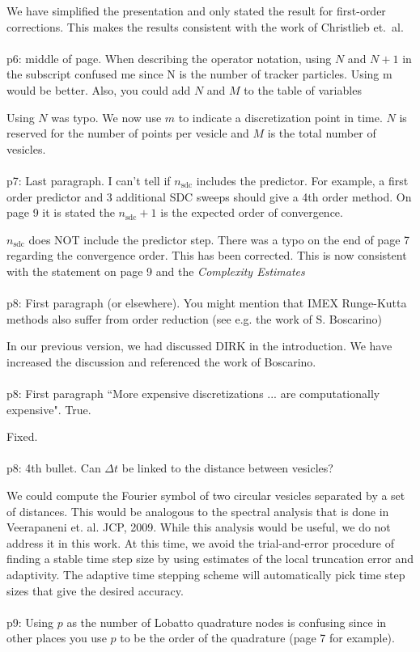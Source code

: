\documentclass[12pt]{article}
\newcommand{\comment}[1]{{\color{blue} #1}}
\newcommand{\sdc}{{\mathrm{sdc}}}
\begin{document}
We have simplified the presentation and only stated the result for
first-order corrections.  This makes the results consistent with the work of
Christlieb et.~al. \\ \\
\comment{p6: middle of page.  When describing the operator notation,
using $N$ and $N+1$ in the subscript confused me since N is the number
of tracker particles.  Using m would be better.  Also, you could add $N$
and $M$ to the table of variables}

Using $N$ was typo.  We now use $m$ to indicate a discretization point
in time.  $N$ is reserved for the number of points per vesicle and $M$
is the total number of vesicles. \\ \\
\comment{p7: Last paragraph.  I can't tell if $n_{\sdc}$ includes the
predictor.  For example, a first order predictor and 3 additional SDC
sweeps should give a 4th order method.  On page 9 it is stated the
$n_{\sdc}+1$ is the expected order of convergence.}

$n_{\sdc}$ does NOT include the predictor step.  There was a typo on the
end of page 7 regarding the convergence order.  This has been corrected.
This is now consistent with the statement on page 9 and the {\em
Complexity Estimates}\\ \\
\comment{p8: First paragraph (or elsewhere).   You might mention that
IMEX Runge-Kutta methods also suffer from order reduction (see e.g. the
work of S. Boscarino)}

In our previous version, we had discussed DIRK in the introduction.  We
have increased the discussion and referenced the work of Boscarino. \\
\\
\comment{p8: First paragraph  ``More expensive discretizations ... are
computationally expensive".  True.}

Fixed. \\ \\
\comment{p8: 4th bullet.  Can $\Delta t$ be linked to the distance
between vesicles?}

We could compute the Fourier symbol of two circular vesicles separated
by a set of distances.  This would be analogous to the spectral analysis
that is done in Veerapaneni et. al. JCP, 2009.  While this analysis
would be useful, we do not address it in this work.  At this time, we
avoid the trial-and-error procedure of finding a stable time step size
by using estimates of the local truncation error and adaptivity.  The
adaptive time stepping scheme will automatically pick time step sizes
that give the desired accuracy. \\ \\
\comment{p9: Using $p$ as the number of Lobatto quadrature nodes is
confusing since in other places you use $p$ to be the order of the
quadrature (page 7 for example).}
\end{document}
